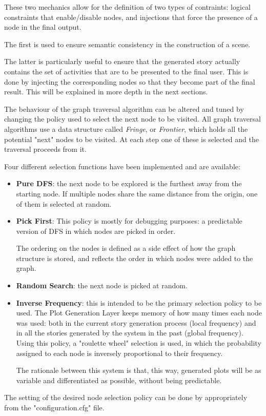 \documentclass[12pt,a4paper,oneside]{report}
\begin{document}
\bigskip

\bigskip

These two mechanics allow for the definition of two types of contraints: logical constraints that enable/disable nodes, and injections that force the presence of a node in the final output.

The first is used to ensure semantic consistency in the construction of a scene. 

The latter is particularly useful to ensure that the generated story actually contains the set of activities that are to be presented to the final user. This is done by injecting the corresponding nodes so that they become part of the final result. This will be explained in more depth in the next sections.

\bigskip

The behaviour of the graph traversal algorithm can be altered and tuned by changing the policy used to select the next node to be visited. All graph traversal algorithms use a data structure called \textit{Fringe}, or \textit{Frontier}, which holds all the potential "next" nodes to be visited. At each step one of these is selected and the traversal proceeds from it.

Four different selection functions have been implemented and are available:

\begin{itemize}\setlength{\itemsep}{0pt}
\item \textbf{Pure DFS}: the next node to be explored is the furthest away from the starting node. If multiple nodes share the same distance from the origin, one of them is selected at random.
\item \textbf{Pick First}: This policy is mostly for debugging purposes: a predictable version of DFS in which nodes are picked in order.

The ordering on the nodes is defined as a side effect of how the graph structure is stored, and reflects the order in which nodes were added to the graph. 
\item \textbf{Random Search}: the next node is picked at random.
\item \textbf{Inverse Frequency}: this is intended to be the primary selection policy to be used. The Plot Generation Layer keeps memory of how many times each node was used: both in the current story generation process (local frequency) and in all the stories generated by the system in the past (global frequency). Using this policy, a "roulette wheel" selection is used, in which the probability assigned to each node is inversely proportional to their frequency.

The rationale between this system is that, this way, generated plots will be as variable and differentiated as possible, without being predictable.
\end{itemize}
The setting of the desired node selection policy can be done by appropriately from the "configuration.cfg" file.
\end{document}
